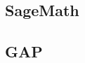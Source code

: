 \documentclass{deliverablereport}
\begin{document}
\subsection{SageMath}


\subsection{GAP}

% 

\end{document}
